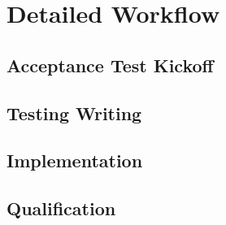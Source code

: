 \section{Detailed Workflow}\label{sec:detailed-workflow}


\subsection{Acceptance Test Kickoff}\label{subsec:acceptance-test-kickoff}

\subsection{Testing Writing}\label{subsec:testing-writing}

\subsection{Implementation}\label{subsec:implementation}

\subsection{Qualification}\label{subsec:qualification}
